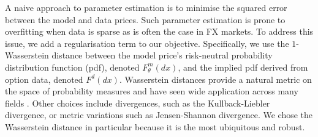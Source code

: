\documentclass[onefignum,onetabnum]{siamonline190516}
\begin{document}

A naive approach to parameter estimation is to minimise the squared error between the model and data prices.
Such parameter estimation is prone to overfitting when data is sparse as is often the case in FX markets. To address this issue, we add a regularisation term to our objective. Specifically, we use the $1$-Wasserstein distance between the model price's risk-neutral probability distribution function (pdf), denoted $F^m_\theta(dx)$, and the implied pdf derived from option data, denoted $F^d(dx)$. Wasserstein distances provide a natural metric on the space of probability measures and have seen wide application across many fields \cite{villani2009optimal}. Other choices include divergences, such as the Kullback-Liebler divergence, or metric variations such as Jensen-Shannon divergence. We chose the Wasserstein distance in particular because it is the most ubiquitous and robust.
\end{document}
